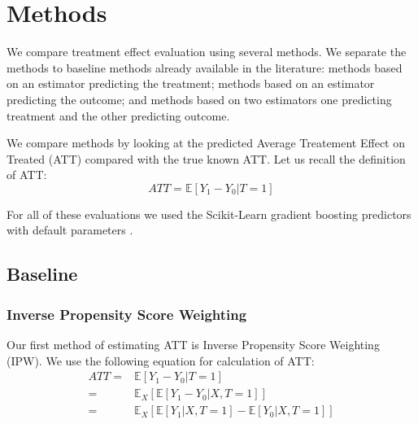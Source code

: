\documentclass{article}
\begin{document}

\section{Methods}
We compare treatment effect evaluation using several methods. We separate the methods to baseline methods already available in the literature: methods based on an estimator predicting the treatment; methods based on an estimator predicting the outcome; and methods based on two estimators one predicting treatment and the other predicting outcome.

We compare methods by looking at the predicted Average Treatement Effect on Treated (ATT) compared with the true known ATT. Let us recall the definition of ATT:
\begin{equation*}
    ATT = \mathbb{E}[Y_1 - Y_0 | T=1]
\end{equation*}

For all of these evaluations we used the Scikit-Learn gradient boosting predictors with default parameters \cite{scikit-learn}. 

\subsection{Baseline}
\subsubsection{Inverse Propensity Score Weighting}
Our first method of estimating ATT is Inverse Propensity Score Weighting (IPW).
We use the following equation for calculation of ATT:
\begin{equation*}
    \begin{split}
        ATT = & \mathbb{E}[Y_1 - Y_0 | T=1] \\
        = & \mathbb{E}_X[\mathbb{E}[Y_1 - Y_0 | X, T=1]] \\
        = & \mathbb{E}_X[\mathbb{E}[Y_1 | X, T=1] - \mathbb{E}[Y_0 | X, T=1]]
    \end{split}
\end{equation*}
\end{document}
